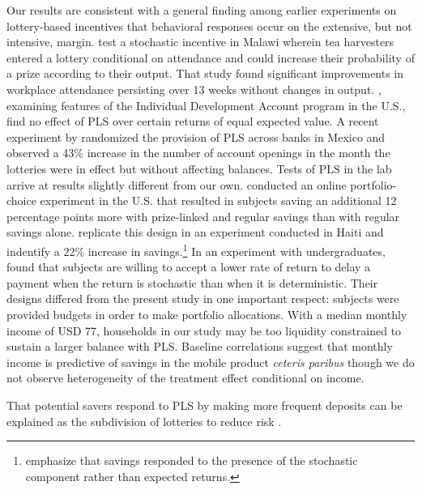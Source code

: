 \documentclass[12pt]{article}
\begin{document}
		

		Our results are consistent with a general finding among earlier experiments on lottery-based incentives that behavioral responses occur on the extensive, but not intensive, margin.  test a stochastic incentive in Malawi wherein tea harvesters entered a lottery conditional on attendance and could increase their probability of a prize according to their output. That study found significant improvements in workplace attendance persisting over 13 weeks without changes in output. , examining features of the Individual Development Account program in the U.S., find no effect of PLS over certain returns of equal expected value. A recent experiment by  randomized the provision of PLS across banks in Mexico and observed a 43\% increase in the number of account openings in the month the lotteries were in effect but without affecting balances. Tests of PLS in the lab arrive at results slightly different from our own.  conducted an online portfolio-choice experiment in the U.S. that resulted in subjects saving an additional 12 percentage points more with prize-linked and regular savings than with regular savings alone.  replicate this design in an experiment conducted in Haiti and indentify a 22\% increase in savings.\footnote{ emphasize that savings responded to the presence of the stochastic component rather than expected returns.} In an experiment with undergraduates,  found that subjects are willing to accept a lower rate of return to delay a payment when the return is stochastic than when it is deterministic. Their designs differed from the present study in one important respect: subjects were provided budgets in order to make portfolio allocations. With a median monthly income of USD 77, households in our study may be too liquidity constrained to sustain a larger balance with PLS. Baseline correlations suggest that monthly income is predictive of savings in the mobile product \textit{ceteris paribus} though we do not observe heterogeneity of the treatment effect conditional on income.

		That potential savers respond to PLS by making more frequent deposits can be explained as the subdivision of lotteries to reduce risk .
\end{document}

